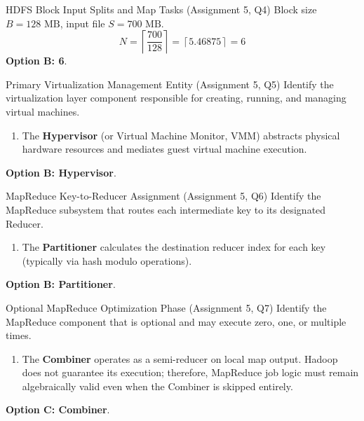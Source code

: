 \begin{solved}{HDFS Block Input Splits and Map Tasks (Assignment 5, Q4)}
\Given Block size $B = 128\text{ MB}$, input file $S = 700\text{ MB}$.
\Steps
\begin{equation}
N = \left\lceil \frac{700}{128} \right\rceil = \left\lceil 5.46875 \right\rceil = 6
\end{equation}
\Answer \textbf{Option B: 6}.
\end{solved}

\begin{solved}{Primary Virtualization Management Entity (Assignment 5, Q5)}
\Given Identify the virtualization layer component responsible for creating, running, and managing virtual machines.
\Steps
\begin{enumerate}[leftmargin=*]
  \item The \textbf{Hypervisor} (or Virtual Machine Monitor, VMM) abstracts physical hardware resources and mediates guest virtual machine execution.
\end{enumerate}
\Answer \textbf{Option B: Hypervisor}.
\end{solved}

\begin{solved}{MapReduce Key-to-Reducer Assignment (Assignment 5, Q6)}
\Given Identify the MapReduce subsystem that routes each intermediate key to its designated Reducer.
\Steps
\begin{enumerate}[leftmargin=*]
  \item The \textbf{Partitioner} calculates the destination reducer index for each key (typically via hash modulo operations).
\end{enumerate}
\Answer \textbf{Option B: Partitioner}.
\end{solved}

\begin{solved}{Optional MapReduce Optimization Phase (Assignment 5, Q7)}
\Given Identify the MapReduce component that is optional and may execute zero, one, or multiple times.
\Steps
\begin{enumerate}[leftmargin=*]
  \item The \textbf{Combiner} operates as a semi-reducer on local map output. Hadoop does not guarantee its execution; therefore, MapReduce job logic must remain algebraically valid even when the Combiner is skipped entirely.
\end{enumerate}
\Answer \textbf{Option C: Combiner}.
\end{solved}

